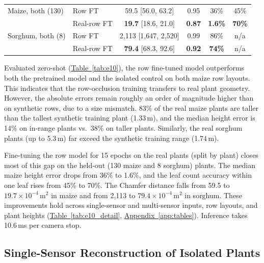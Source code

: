 \documentclass[10pt,twocolumn,letterpaper]{article}
\newcommand{\updtwo}[1]{#1}
\newcommand{\tabref}[1]{\hyperref[#1]{Table~\ref*{#1}}}
\newcommand{\appendixref}[1]{\hyperref[#1]{Appendix~\ref*{#1}}}
\begin{document}
\begin{table}[t]
{\begin{tabular}{llcccc}
    Maize, both (130) & Row FT & 59.5 {\tiny[56.0, 63.2]} & 0.95 & 36\% & 45\% \\
     & Real-row FT & \textbf{19.7} {\tiny[18.6, 21.0]} & \textbf{0.87} & \textbf{1.6\%} & \textbf{70\%} \\
    Sorghum, both (8) & Row FT & 2{,}113 {\tiny[1{,}647, 2{,}520]} & 0.99 & \updtwo{86\%} & n/a \\
     & Real-row FT & \textbf{79.4} {\tiny[68.3, 92.6]} & \textbf{0.92} & \updtwo{\textbf{74\%}} & n/a \\
    \bottomrule
  \end{tabular}}
\end{table}

Evaluated zero-shot (\tabref{tab:e10}), the row fine-tuned model outperforms both the pretrained model and the isolated control on both maize row layouts. This indicates that the row-occlusion training transfers to real plant geometry. However, the absolute errors remain roughly an order of magnitude higher than on synthetic rows, due to a size mismatch. 83\% of the real maize plants are taller than the tallest synthetic training plant (1.33\,m), and the median height error is 14\% on in-range plants vs.\ 38\% on taller plants. Similarly, the real sorghum plants (up to 5.3\,m) far exceed the synthetic training range (1.74\,m).


Fine-tuning the row model for 15 epochs on the real plants (split by plant) closes most of this gap on the held-out (130 maize and 8 sorghum) plants. The median maize height error drops from 36\% to 1.6\%, and the leaf count accuracy within one leaf rises from 45\% to 70\%. The Chamfer distance falls from 59.5 to $19.7 \times 10^{-4}\,\mathrm{m}^2$ in maize and from 2{,}113 to $79.4 \times 10^{-4}\,\mathrm{m}^2$ in sorghum. These improvements hold across single-sensor and multi-sensor inputs, row layouts, and plant heights (\tabref{tab:e10_detail}, \appendixref{app:tables}). Inference takes 10.6\,ms per camera stop. %

\subsection{Single-Sensor Reconstruction of Isolated Plants}
\label{sec:regime1}\label{sec:exp-regime1}\label{sec:res-distill}\label{sec:exp-main}
\end{document}
